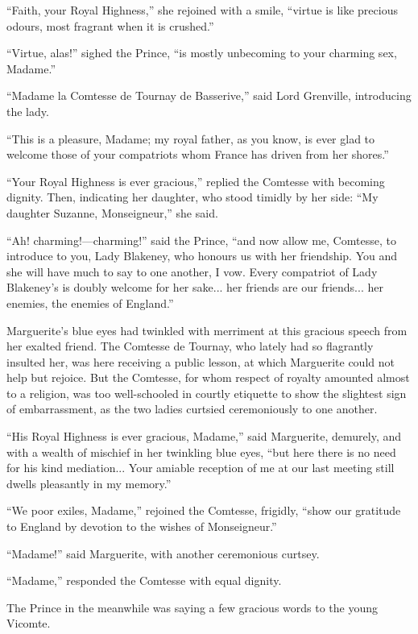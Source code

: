 \enquote{Faith, your Royal Highness,} she rejoined with a smile, \enquote{virtue is like precious odours, most fragrant when it is crushed.}

\enquote{Virtue, alas!} sighed the Prince, \enquote{is mostly unbecoming to your charming sex, Madame.}

\enquote{Madame la Comtesse de Tournay de Basserive,} said Lord Grenville, introducing the lady.

\enquote{This is a pleasure, Madame; my royal father, as you know, is ever glad to welcome those of your compatriots whom France has driven from her shores.}

\enquote{Your Royal Highness is ever gracious,} replied the Comtesse with becoming dignity. Then, indicating her daughter, who stood timidly by her side: \enquote{My daughter Suzanne, Monseigneur,} she said.

\enquote{Ah! charming!---charming!} said the Prince, \enquote{and now allow me, Comtesse, to introduce to you, Lady Blakeney, who honours us with her friendship. You and she will have much to say to one another, I vow. Every compatriot of Lady Blakeney's is doubly welcome for her sake... her friends are our friends... her enemies, the enemies of England.}

Marguerite's blue eyes had twinkled with merriment at this gracious speech from her exalted friend. The Comtesse de Tournay, who lately had so flagrantly insulted her, was here receiving a public lesson, at which Marguerite could not help but rejoice. But the Comtesse, for whom respect of royalty amounted almost to a religion, was too well-schooled in courtly etiquette to show the slightest sign of embarrassment, as the two ladies curtsied ceremoniously to one another.

\enquote{His Royal Highness is ever gracious, Madame,} said Marguerite, demurely, and with a wealth of mischief in her twinkling blue eyes, \enquote{but here there is no need for his kind mediation... Your amiable reception of me at our last meeting still dwells pleasantly in my memory.}

\enquote{We poor exiles, Madame,} rejoined the Comtesse, frigidly, \enquote{show our gratitude to England by devotion to the wishes of Monseigneur.}

\enquote{Madame!} said Marguerite, with another ceremonious curtsey.

\enquote{Madame,} responded the Comtesse with equal dignity.

The Prince in the meanwhile was saying a few gracious words to the young Vicomte.

